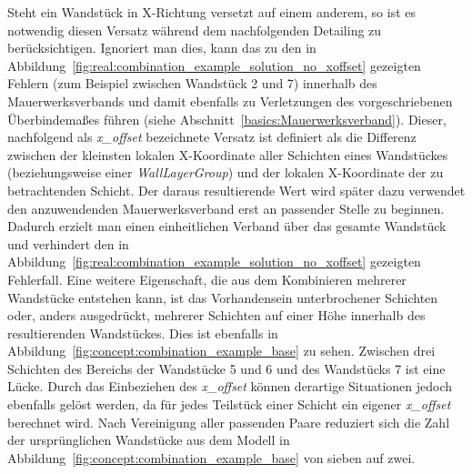 Steht ein Wandstück in X-Richtung versetzt auf einem anderem, so ist es notwendig diesen Versatz während dem nachfolgenden Detailing zu berücksichtigen.
Ignoriert man dies, kann das zu den in Abbildung~\ref{fig:real:combination_example_solution_no_xoffset} gezeigten Fehlern (zum Beispiel zwischen Wandstück 2 und 7) innerhalb des Mauerwerksverbands und damit ebenfalls zu Verletzungen des vorgeschriebenen Überbindemaßes führen (siehe Abschnitt~\ref*{basics:Mauerwerksverband}).
Dieser, nachfolgend als \textit{x\_offset} bezeichnete Versatz ist definiert als die Differenz zwischen der kleinsten lokalen X-Koordinate aller Schichten eines Wandstückes (beziehungsweise einer \textit{WallLayerGroup}) und der lokalen X-Koordinate der zu betrachtenden Schicht.
Der daraus resultierende Wert wird später dazu verwendet den anzuwendenden Mauerwerksverband erst an passender Stelle zu beginnen.
Dadurch erzielt man einen einheitlichen Verband über das gesamte Wandstück und verhindert den in Abbildung~\ref{fig:real:combination_example_solution_no_xoffset} gezeigten Fehlerfall.
Eine weitere Eigenschaft, die aus dem Kombinieren mehrerer Wandstücke entstehen kann, ist das Vorhandensein unterbrochener Schichten oder, anders ausgedrückt, mehrerer Schichten auf einer Höhe innerhalb des resultierenden Wandstückes.
Dies ist ebenfalls in Abbildung~\ref{fig:concept:combination_example_base} zu sehen. 
Zwischen drei Schichten des Bereichs der Wandstücke 5 und 6 und des Wandstücks 7 ist eine Lücke.
Durch das Einbeziehen des \textit{x\_offset} können derartige Situationen jedoch ebenfalls gelöst werden, da für jedes Teilstück einer Schicht ein eigener \textit{x\_offset} berechnet wird.
Nach Vereinigung aller passenden Paare reduziert sich die Zahl der ursprünglichen Wandstücke aus dem Modell in Abbildung~\ref{fig:concept:combination_example_base} von sieben auf zwei.

